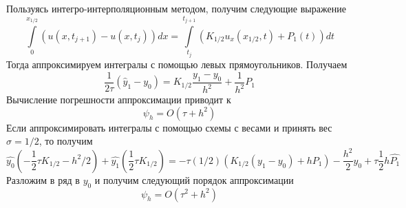\documentclass{article}
\begin{document}
\begin{enumerate}
		Пользуясь интегро-интерполяционным методом, получим следующие выражение 
		\begin{equation*}
			\int \limits_0^{x_{1/2}} (u(x, t_{j+1}) - u(x, t_j)) dx 
			=  \int \limits_{t_j}^{t_{j+1}}
			(K_{1/2} u_x (x_{1/2}, t) + P_1(t)) dt
		\end{equation*}
		Тогда аппроксимируем интегралы с помощью левых прямоугольников. 
		Получаем 
		\begin{equation*}
			\frac{1}{2\tau}(\hat{y}_{1}-  y_0) = K_{1/2} \frac{y_{1} - y_0}{h^2} 
			+ \frac{1}{h^2} P_1
		\end{equation*}
		Вычисление погрешности аппроксимации приводит к 
		\begin{equation*}
			\psi_h = O(\tau + h^2)
		\end{equation*}
		Если аппроксимировать интегралы с помощью схемы с весами и принять вес 
		$\sigma = 1/2$, то получим 
		\begin{equation*}
			\hat{y_0} (-\frac{1}{2}\tau K_{1/2} - h^2/2) + 
			\hat{y_1} (\frac{1}{2} \tau K_{1/2}) = 
			- \tau (1/2) (K_{1/2} (y_1 - y_0) + h P_1) - \frac{h^2}{2} y_0 + 
			\tau \frac{1}{2} h \hat{P_1}
		\end{equation*}
		Разложим в ряд в $y_0$ и получим следующий порядок аппроксимации 
		\begin{equation*}
			\psi_h = O(\tau^2 + h^2)
		\end{equation*}


\end{enumerate}
\end{document}
